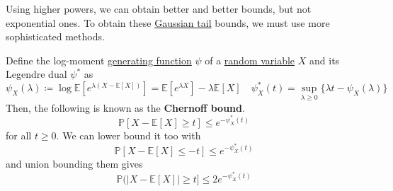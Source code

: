   Using higher powers, we can obtain better and better bounds, but not exponential ones. To obtain these \hyperref[prob-thm:gaussian-tail-inequality]{Gaussian tail} bounds, we must use more sophisticated methods. 

  \begin{lemma}
    \label{thm:chernoff-bound}
  Define the log-moment \hyperref[sp-def:generating-function]{generating function} $\psi$ of a \hyperref[prob-def:random-variable]{random variable} $X$ and its Legendre dual $\psi^*$ as 
  \begin{equation}
    \psi_X (\lambda) \coloneqq \log \mathbb{E}[ e^{\lambda (X - \mathbb{E}[X])} ] = \mathbb{E}[ e^{\lambda X} ] - \lambda \mathbb{E}[X] \quad \psi_X^* (t) = \sup_{\lambda \geq 0} \{ \lambda t - \psi_X(\lambda)\}
  \end{equation}
  Then, the following is known as the \textbf{Chernoff bound}. 
  \begin{equation}
    \mathbb{P}[X - \mathbb{E}[X] \geq t] \leq e^{-\psi_X^* (t)}
  \end{equation}
  for all $t \geq 0$. We can lower bound it too with 
  \begin{equation}
    \mathbb{P}[X - \mathbb{E}[X] \leq -t] \leq e^{-\psi_X^* (t)}
  \end{equation}
  and union bounding them gives 
  \begin{equation}
    \mathbb{P}(|X - \mathbb{E}[X] | \geq t ] \leq 2e^{- \psi_X^* (t)}
  \end{equation}
  \end{lemma}
